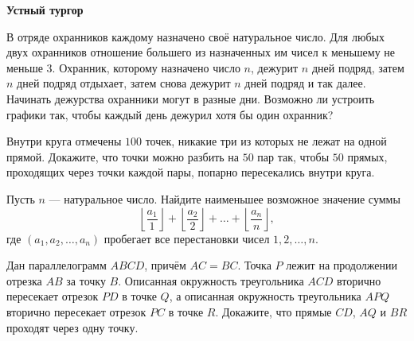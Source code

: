 \begin{center}
    {\Large\bfseries Устный тургор}
\end{center}

В отряде охранников каждому назначено своё натуральное число. Для любых двух охранников отношение большего из назначенных им чисел к меньшему не меньше $3$. Охранник, которому назначено число $n$, дежурит $n$ дней подряд, затем $n$ дней подряд отдыхает, затем снова дежурит $n$ дней подряд и так далее. Начинать дежурства охранники могут в разные дни. Возможно ли устроить графики так, чтобы каждый день дежурил хотя бы один охранник?

\medskip

Внутри круга отмечены $100$ точек, никакие три из которых не лежат на одной прямой. Докажите, что точки можно разбить на $50$ пар так, чтобы $50$ прямых, проходящих через точки каждой пары, попарно пересекались внутри круга.

\medskip

Пусть $n$ --- натуральное число. Найдите наименьшее возможное значение суммы
\[
  \left\lfloor\frac{a_1}{1}\right\rfloor+
  \left\lfloor\frac{a_2}{2}\right\rfloor+\dots+
  \left\lfloor\frac{a_n}{n}\right\rfloor,
\]
где $(a_1,a_2,\dots,a_n)$ пробегает все перестановки чисел $1,2,\dots,n$.

\medskip

Дан параллелограмм $ABCD$, причём $AC=BC$. Точка $P$ лежит на продолжении отрезка $AB$ за точку $B$. Описанная окружность треугольника $ACD$ вторично пересекает отрезок $PD$ в точке $Q$, а описанная окружность треугольника $APQ$ вторично пересекает отрезок $PC$ в точке $R$. Докажите, что прямые $CD$, $AQ$ и $BR$ проходят через одну точку.

